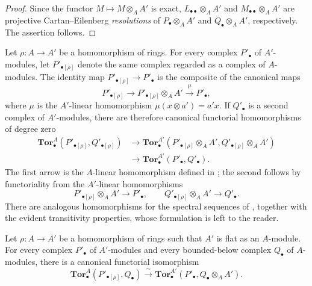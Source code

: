 \begin{proof}
Since the functor $M\longmapsto M\otimes_AA'$ is exact,
$L_{\bullet\bullet}\otimes_AA'$ and
$M_{\bullet\bullet}\otimes_AA'$ are projective
Cartan--Eilenberg \emph{resolutions} of $P_\bullet\otimes_AA'$ and
$Q_\bullet\otimes_AA'$, respectively.  The assertion follows.
\end{proof}

\begin{env}[6.3.10]
\label{III.6.3.10}
Let $\rho:A\longrightarrow A'$ be a homomorphism of rings.  For
every complex $P'_\bullet$ of $A'$-modules, let
$P'_{\bullet[\rho]}$ denote the same complex regarded as a complex
of $A$-modules.  The identity map
$P'_{\bullet[\rho]}\longrightarrow P'_\bullet$ is the composite of
the canonical maps
\[
  P'_{\bullet[\rho]}
  \longrightarrow
  P'_{\bullet[\rho]}\otimes_AA'
  \xrightarrow{\ \mu\ }P'_\bullet,
\]
where $\mu$ is the $A'$-linear homomorphism
$\mu(x\otimes a')=a'x$.  If $Q'_\bullet$ is a second complex of
$A'$-modules, there are therefore canonical functorial
homomorphisms of degree zero
\[
  \begin{split}
  \mathbf{Tor}_\bullet^A(P'_{\bullet[\rho]},Q'_{\bullet[\rho]})
  &\longrightarrow
  \mathbf{Tor}_\bullet^{A'}
  (P'_{\bullet[\rho]}\otimes_AA',
   Q'_{\bullet[\rho]}\otimes_AA')\\
  &\longrightarrow
  \mathbf{Tor}_\bullet^{A'}(P'_\bullet,Q'_\bullet).
  \end{split}
  \tag{6.3.10.1}\label{III.6.3.10.1}
\]
The first arrow is the $A$-linear homomorphism defined in
; the second follows by functoriality from the
$A'$-linear homomorphisms
\[
  P'_{\bullet[\rho]}\otimes_AA'\longrightarrow P'_\bullet,
  \qquad
  Q'_{\bullet[\rho]}\otimes_AA'\longrightarrow Q'_\bullet.
\]
There are analogous homomorphisms for the spectral sequences of
, together with the evident transitivity
properties, whose formulation is left to the reader.
\end{env}

\begin{proposition}[6.3.11]
\label{III.6.3.11}
Let $\rho:A\longrightarrow A'$ be a homomorphism of rings such that
$A'$ is flat as an $A$-module.  For every complex $P'_\bullet$ of
$A'$-modules and every bounded-below complex $Q_\bullet$ of
$A$-modules, there is a canonical functorial isomorphism
\[
  \mathbf{Tor}_\bullet^A(P'_{\bullet[\rho]},Q_\bullet)
  \xrightarrow{\ \sim\ }
  \mathbf{Tor}_\bullet^{A'}(P'_\bullet,Q_\bullet\otimes_AA').
  \tag{6.3.11.1}\label{III.6.3.11.1}
\]
\end{proposition}

